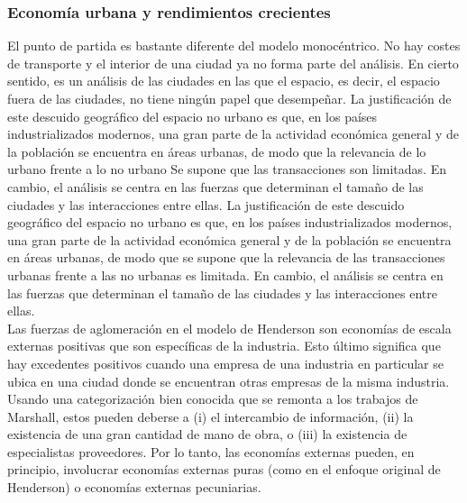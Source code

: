 \subsubsection{Economía urbana y rendimientos crecientes}
El punto de partida es bastante diferente del modelo monocéntrico. No hay costes de transporte y el interior de una ciudad ya no forma parte del análisis. En cierto sentido, es un análisis de las ciudades en las que el espacio, es decir, el espacio fuera de las ciudades, no tiene ningún papel que desempeñar. La justificación de este descuido geográfico del espacio no urbano es que, en los países industrializados modernos, una gran parte de la actividad económica general y de la población se encuentra en áreas urbanas, de modo que la relevancia de lo urbano frente a lo no urbano Se supone que las transacciones son limitadas. En cambio, el análisis se centra en las fuerzas que determinan el tamaño de las ciudades y las interacciones entre ellas. La justificación de este descuido geográfico del espacio no urbano es que, en los países industrializados modernos, una gran parte de la actividad económica general y de la población se encuentra en áreas urbanas, de modo que se supone que la relevancia de las transacciones urbanas frente a las no urbanas es limitada. En cambio, el análisis se centra en las fuerzas que determinan el tamaño de las ciudades y las interacciones entre ellas.\\
Las fuerzas de aglomeración en el modelo de Henderson son economías de escala externas positivas que son específicas de la industria. Esto último significa que hay excedentes positivos cuando una empresa de una industria en particular se ubica en una ciudad donde se encuentran otras empresas de la misma industria. \\
Usando una categorización bien conocida que se remonta a los trabajos de Marshall, estos pueden deberse a (i) el intercambio de información, (ii) la existencia de una gran cantidad de mano de obra, o (iii) la existencia de especialistas proveedores. Por lo tanto, las economías externas pueden, en principio, involucrar economías externas puras (como en el enfoque original de Henderson) o economías externas pecuniarias.\\
